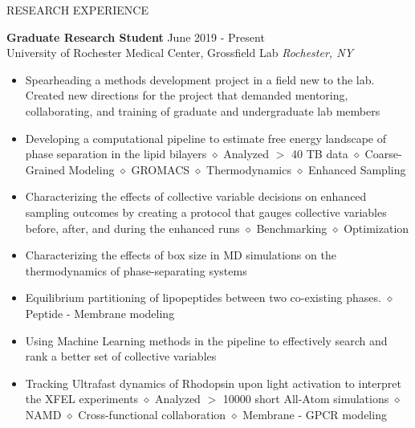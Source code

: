 \documentclass{resume} %
\begin{document}

\begin{rSection}{RESEARCH EXPERIENCE}

\textbf{Graduate Research Student} \hfill June 2019 - Present\\
University of Rochester Medical Center, Grossfield Lab \hfill \textit{Rochester, NY}
 \begin{itemize}
    \itemsep -3pt {}
    \item Spearheading a methods development project in a field new to the lab. Created new directions for the project that demanded mentoring, collaborating, and training of graduate and undergraduate lab members
     \item Developing a computational pipeline to estimate free energy landscape of phase separation in the lipid bilayers $\diamond$ Analyzed $>$ 40 TB data
     $\diamond$ Coarse-Grained Modeling $\diamond$ GROMACS  $\diamond$ Thermodynamics $\diamond$ Enhanced Sampling
     \item Characterizing the effects of collective variable decisions on enhanced sampling outcomes by creating a protocol that gauges collective variables before, after, and during the enhanced runs
     $\diamond$ Benchmarking $\diamond$ Optimization   
    \item Characterizing the effects of box size in MD simulations on the thermodynamics of phase-separating systems
    \item Equilibrium partitioning of lipopeptides between two co-existing phases. $\diamond$ Peptide - Membrane modeling
    \item Using Machine Learning methods in the pipeline to effectively search and rank a better set of collective variables
    \item Tracking Ultrafast dynamics of Rhodopsin upon light activation to interpret the XFEL experiments $\diamond$ Analyzed $>$ 10000 short All-Atom simulations
    $\diamond$ NAMD $\diamond$ Cross-functional collaboration $\diamond$  Membrane - GPCR modeling
 \end{itemize}
 

\end{rSection}
\end{document}
